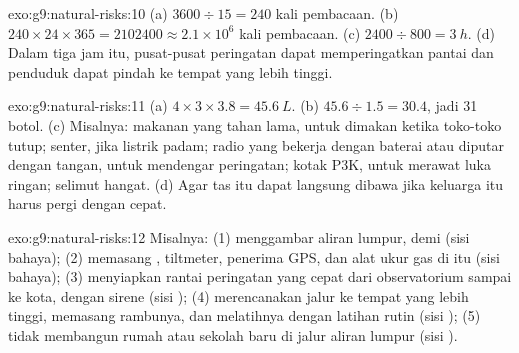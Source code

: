 \begin{solution}{exo:g9:natural-risks:10}
(a) $3600 \div 15 = 240$ kali pembacaan. (b) $240 \times 24 \times 365 =
\num{2102400} \approx 2.1 \times 10^6$ kali pembacaan. (c) $2400 \div 800 =
\qty{3}{h}$. (d) Dalam tiga jam itu, pusat-pusat peringatan dapat
memperingatkan pantai dan penduduk dapat pindah ke tempat yang lebih
tinggi.
\end{solution}

\begin{solution}{exo:g9:natural-risks:11}
(a) $4 \times 3 \times 3.8 = \qty{45.6}{L}$. (b) $45.6 \div 1.5 = 30.4$,
jadi 31 botol. (c) Misalnya: makanan yang tahan lama, untuk dimakan ketika
toko-toko tutup; senter, jika listrik padam; radio yang bekerja dengan
baterai atau diputar dengan tangan, untuk mendengar peringatan; kotak P3K,
untuk merawat luka ringan; selimut hangat. (d) Agar tas itu dapat langsung
dibawa jika keluarga itu harus pergi dengan cepat.
\end{solution}

\begin{solution}{exo:g9:natural-risks:12}
Misalnya: (1) menggambar  aliran lumpur,  demi 
(sisi bahaya); (2) memasang , tiltmeter, penerima GPS, dan alat
ukur gas di  itu (sisi bahaya); (3) menyiapkan rantai peringatan
yang cepat dari observatorium sampai ke kota, dengan sirene (sisi
); (4) merencanakan jalur ke tempat yang lebih tinggi,
memasang rambunya, dan melatihnya dengan latihan rutin (sisi );
(5) tidak membangun rumah atau sekolah baru di jalur aliran lumpur (sisi
).
\end{solution}

